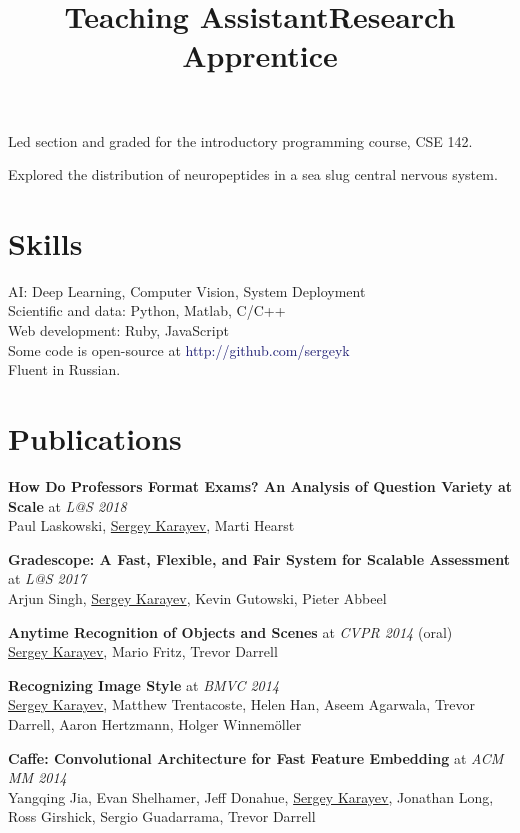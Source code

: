 \documentclass[line, margin]{res}
\begin{document}
\begin{resume}
\title{\bf Teaching Assistant}
\begin{position}
Led section and graded for the introductory programming course, CSE 142.
\end{position}

\title{\bf Research Apprentice}
\begin{position}
Explored the distribution of neuropeptides in a sea slug central nervous system.
\end{position}

\section{\sc Skills}
AI: Deep Learning, Computer Vision, System Deployment\\
Scientific and data: Python, Matlab, C/C++\\
Web development: Ruby, JavaScript\\
Some code is open-source at \textcolor{MidnightBlue}{http://github.com/sergeyk}\\
Fluent in Russian.


\section{\sc Publications}

\textbf{How Do Professors Format Exams? An Analysis of Question Variety at Scale} at \emph{L@S 2018}\\
Paul Laskowski, \underline{Sergey Karayev}, Marti Hearst

\textbf{Gradescope: A Fast, Flexible, and Fair System for Scalable Assessment} at \emph{L@S 2017}\\
Arjun Singh, \underline{Sergey Karayev}, Kevin Gutowski, Pieter Abbeel

\textbf{Anytime Recognition of Objects and Scenes} at \emph{CVPR 2014} (oral)\\
\underline{Sergey Karayev}, Mario Fritz, Trevor Darrell

\textbf{Recognizing Image Style} at \emph{BMVC 2014}\\
\underline{Sergey Karayev}, Matthew Trentacoste, Helen Han, Aseem Agarwala, Trevor Darrell, Aaron Hertzmann, Holger Winnem\"{o}ller

\textbf{Caffe: Convolutional Architecture for Fast Feature Embedding} at \emph{ACM MM 2014}\\
Yangqing Jia, Evan Shelhamer, Jeff Donahue, \underline{Sergey Karayev},
Jonathan Long, Ross Girshick, Sergio Guadarrama, Trevor Darrell


\end{resume}
\end{document}
